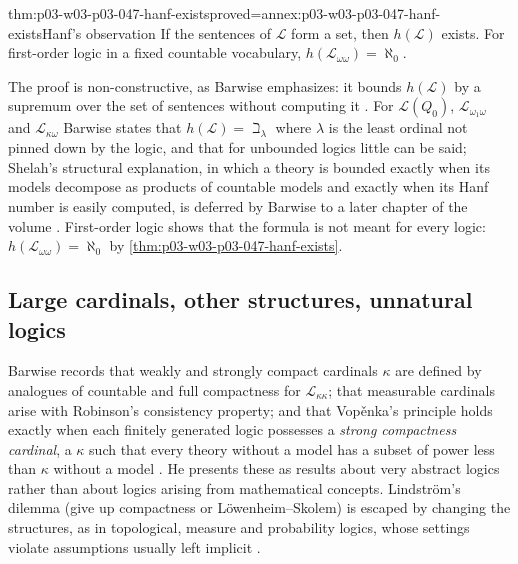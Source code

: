 \begin{hbtheorem}{thm:p03-w03-p03-047-hanf-exists}{proved=annex:p03-w03-p03-047-hanf-exists}{Hanf's observation}
If the sentences of \(\mathscr L\) form a set, then \(h(\mathscr L)\) exists.
For first-order logic in a fixed countable vocabulary,
\(h(\mathscr L_{\omega\omega})=\aleph_0\).
\end{hbtheorem}

The proof is non-constructive, as Barwise emphasizes: it bounds
\(h(\mathscr L)\) by a supremum over the set of sentences without computing
it \cite[Ch.~I, \S2.6, p.~19]{Barwise1985BackgroundAims}.  For
\(\mathscr L(Q_0)\), \(\mathscr L_{\omega_1\omega}\) and
\(\mathscr L_{\kappa\omega}\) Barwise states that \(h(\mathscr L)=\beth_\lambda\)
where \(\lambda\) is the least ordinal not pinned down by the logic, and that
for unbounded logics little can be said; Shelah's structural explanation,
in which a theory is bounded exactly when its models decompose as products
of countable models and exactly when its Hanf number is easily computed, is
deferred by Barwise to a later chapter of the volume
\cite[Ch.~I, \S2.6, pp.~19--20]{Barwise1985BackgroundAims}.  First-order logic
shows that the formula is not meant for every logic:
\(h(\mathscr L_{\omega\omega})=\aleph_0\) by \cref{thm:p03-w03-p03-047-hanf-exists}.

\subsection{Large cardinals, other structures, unnatural logics}

Barwise records that weakly and strongly compact cardinals \(\kappa\) are
defined by analogues of countable and full compactness for
\(\mathscr L_{\kappa\kappa}\); that measurable cardinals arise with
Robinson's consistency property; and that Vop\v{e}nka's principle holds exactly when each finitely generated logic
possesses a \emph{strong compactness cardinal}, a \(\kappa\) such that every theory
without a model has a subset of power less than \(\kappa\) without a model
\cite[Ch.~I, \S2.7, pp.~20--21]{Barwise1985BackgroundAims}.  He presents these
as results about very abstract logics rather than about logics arising from
mathematical concepts.  Lindstr\"om's dilemma (give up compactness or
L\"owenheim--Skolem) is escaped by changing the structures, as in
topological, measure and probability logics, whose settings violate
assumptions usually left implicit \cite[Ch.~I, \S2.8, p.~21]{Barwise1985BackgroundAims}.

